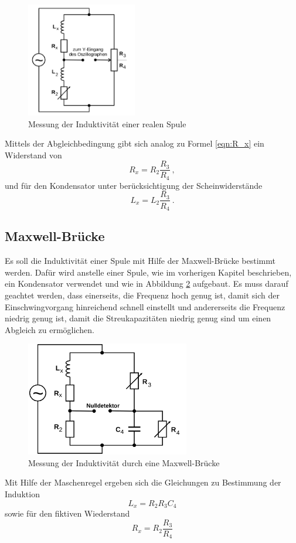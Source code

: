 \begin{figure}
  \centering
  \includegraphics[height=5cm]{picture/4.png}
  \caption{Messung der Induktivität einer realen Spule \cite{sample}}
  \label{fig:L}
\end{figure}
Mittels der Abgleichbedingung gibt sich analog zu Formel \ref{eqn:R_x} ein Widerstand von
\begin{equation*}
     R_x = R_2 \frac{R_3}{R_4} \ ,
\end{equation*}
und für den Kondensator unter berücksichtigung der Scheinwiderstände
\begin{equation}
   L_x = L_2 \frac{R_3}{R_4} \ .
   \label{eqn:L_x}
\end{equation}
\subsection{Maxwell-Brücke}
Es soll die Induktivität einer Spule mit Hilfe der Maxwell-Brücke bestimmt werden. Dafür wird anstelle einer Spule, wie im vorherigen Kapitel beschrieben, ein Kondensator verwendet und wie in Abbildung \ref{fig:Max-Br} aufgebaut. Es muss darauf geachtet werden, dass einerseits, die Frequenz hoch genug ist, damit sich der Einschwingvorgang hinreichend schnell einstellt und andererseits die Frequenz niedrig genug ist, damit die Streukapazitäten niedrig genug sind um einen Abgleich zu ermöglichen.
\begin{figure}
  \centering
  \includegraphics[height=5cm]{picture/5.png}
  \caption{Messung der Induktivität durch eine Maxwell-Brücke \cite{sample}}
  \label{fig:Max-Br}
\end{figure}
Mit Hilfe der Maschenregel ergeben sich die Gleichungen zu Bestimmung der Induktion
\begin{equation}
  L_x = R_2 R_3 C_4
  \label{eqn:L_m}
\end{equation}
sowie für den fiktiven Wiederstand
\begin{equation*}
  R_x = R_2 \frac{R_3}{R_4}
\end{equation*}

